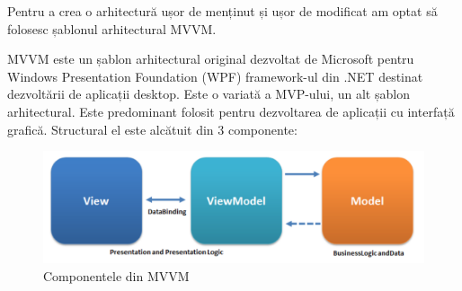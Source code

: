 \documentclass[12pt]{article}
\begin{document}
Pentru a crea o arhitectură ușor de menținut și ușor de modificat am optat să folosesc
șablonul arhitectural MVVM.

MVVM este un șablon arhitectural original dezvoltat de Microsoft pentru Windows Presentation Foundation (WPF) framework-ul
din .NET destinat dezvoltării de aplicații desktop. Este o variată a MVP-ului, un alt șablon arhitectural.
Este predominant folosit pentru dezvoltarea de aplicații cu interfață grafică. Structural el este alcătuit din 3 componente:

\begin{figure}[H]
\centering
\includegraphics[width=12cm]{mvvm.png}
\caption{Componentele din MVVM \nocite{mvvmpng}}
\end{figure}
\end{document}

